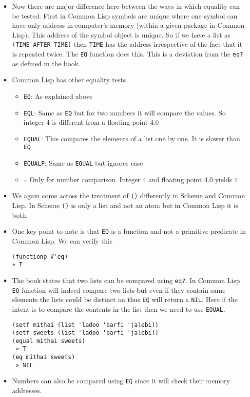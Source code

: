 \documentclass[11pt]{article}
\begin{document}
\begin{itemize}
\item Now there are major difference here between the ways in which equality can be tested. First in Common Lisp symbols
are unique where one symbol can have only address in computer's memory (within a given package in Common Lisp).
This address of the symbol object is unique. So if we have a list as \texttt{(TIME AFTER TIME)} then \texttt{TIME} has the address
irrespective of the fact that it is repeated twice. The \texttt{EQ} function does this. This is a deviation from the
\texttt{eq?} as defined in the book.
\item Common Lisp has other equality tests
\begin{itemize}
\item \texttt{EQ}: As explained above
\item \texttt{EQL}: Same as \texttt{EQ} but for two numbers it will compare the values. So integer 4 is different from a floating
point 4.0
\item \texttt{EQUAL}: This compares the elements of a list one by one. It is slower than \texttt{EQ}
\item \texttt{EQUALP}: Same as \texttt{EQUAL} but ignores case
\item \texttt{=} Only for number comparison. Integer 4 and floating point 4.0 yields \texttt{T}
\end{itemize}
\item We again come across the treatment of \texttt{()} differently in Scheme and Common Lisp. In Scheme \texttt{()} is only a list and
not an atom but in Common Lisp it is both.
\item One key point to note is that \texttt{EQ} is a function and not a primitive predicate in Common Lisp. We can verify this
\begin{verbatim}
(functionp #'eq)
» T
\end{verbatim}
\item The book states that two lists can be compared using \texttt{eq?}. In Common Lisp \texttt{EQ} function will indeed compare two
lists but even if they contain same elements the lists could be distinct an thus \texttt{EQ} will return a \texttt{NIL}. Here if
the intent is to compare the contents in the list then we need to use \texttt{EQUAL}.
\begin{verbatim}
(setf mithai (list 'ladoo 'barfi 'jalebi))
(setf sweets (list 'ladoo 'barfi 'jalebi))
(equal mithai sweets)
 » T
(eq mithai sweets)
 » NIL
\end{verbatim}
\item Numbers can also be compared using \texttt{EQ} since it will check their memory addresses.
\end{itemize}
\end{document}
